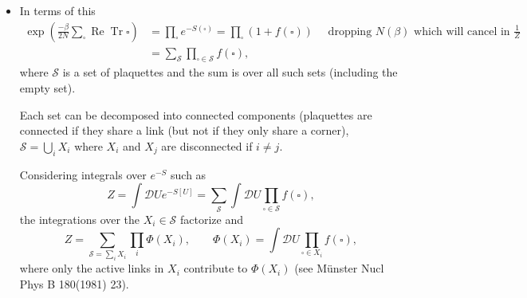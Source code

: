 \begin{itemize}
\begin{equation}
\begin{aligned}
 e^{-S(\square)}&=\exp \left(-\frac{\beta}{2 N} \operatorname{Re} \operatorname{Tr} \square\right)=\sum_{r} f_{r} X_{r}(\square) \\
& =N(\beta)\left(1+\sum_{r \neq 0} \tilde{f}_{r} \chi_{r}(\square) \right) \equiv N(\beta)\left(1+f(\square) \right) \\
\end{aligned}
\end{equation}
(note that $\square$ without trace is in the adjoint+singlet representation) where
\begin{align}
    N(\beta) &= \int \text{d}U e^{-\frac{\beta}{2 N}  \operatorname{Re}\operatorname{Tr}(U)} \nonumber\\
    \tilde{f}_r &= \frac{1}{N(\beta)} \int \text{d}U e^{-\frac{\beta}{2N}\operatorname{Re}\operatorname{Tr}(U)} \chi^*_r(U),
\end{align}
and where $r \neq 0$ means that we do not sum over the singlet representation.

  \item In terms of this
\begin{equation}
\begin{aligned}
\exp \left(\frac{-\beta}{2 N} \sum_{\square} \operatorname{Re}\operatorname{Tr}\square\right) & =\prod_{\square} e^{-S(\square)}=\prod_{\square}(1+f(\square)) \quad \text { dropping } N(\beta) \text { which will cancel in  } \frac{1}{Z} \\
& =\sum_{\mathcal{S}} \prod_{\square \in \mathcal{S}} f(\square),
\end{aligned}
\end{equation}
where $\mathcal{S}$ is a set of plaquettes and the sum is over all such sets (including the empty set).

Each set can be decomposed into connected components (plaquettes are connected if they share a link (but not if they only share a corner), $\mathcal{S} = \bigcup_i X_i$ where $X_i$ and $X_j$ are disconnected if $i \neq j$.

Considering integrals over $e^{-S}$ such as
\begin{equation}
Z=\int \mathcal{D}U e^{-S[U]}=\sum_{\mathcal{S}} \int \mathcal{D}U\prod_{\square \in \mathcal{S}} f(\square),
\end{equation}
the integrations over the $X_i \in \mathcal{S}$ factorize and 
\begin{equation}
    Z = \sum_{\mathcal{S} = \sum_i X_i}\prod_i \Phi(X_i), \qquad \Phi(X_i) = \int \mathcal{D}U \prod_{\square \in X_i} f (\square),
\end{equation}
where only the active links in $X_i$ contribute to $\Phi(X_i)$ (see M{\"u}nster Nucl Phys B 180(1981) 23).


\end{itemize}
